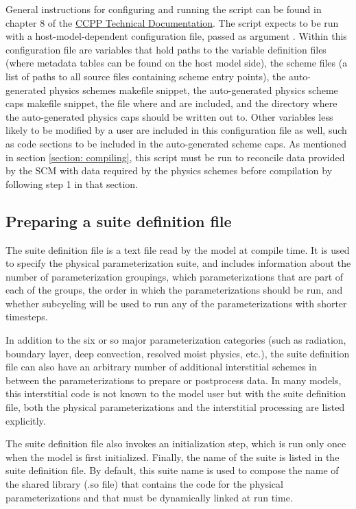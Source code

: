 General instructions for configuring and running the  script can be found in chapter 8 of the \href{https://ccpp-techdoc.readthedocs.io/en/v4.1.0/}{CCPP Technical Documentation}. The script expects to be run with a host-model-dependent configuration file, passed as argument . Within this configuration file are variables that hold paths to the variable definition files (where metadata tables can be found on the host model side), the scheme files (a list of paths to all source files containing scheme entry points), the auto-generated physics schemes makefile snippet, the auto-generated physics scheme caps makefile snippet, the file where  and  are included, and the directory where the auto-generated physics caps should be written out to. Other variables less likely to be modified by a user are included in this configuration file as well, such as code sections to be included in the auto-generated scheme caps. As mentioned in section \ref{section: compiling}, this script must be run to reconcile data provided by the SCM with data required by the physics schemes before compilation by following step 1 in that section.

\subsection{Preparing a suite definition file}
The suite definition file is a text file read by the model at compile time. It is used to specify the physical parameterization suite, and includes information about the number of parameterization groupings, which parameterizations that are part of each of the groups, the order in which the parameterizations should be run, and whether subcycling will be used to run any of the parameterizations with shorter timesteps.

In addition to the six or so major parameterization categories (such as radiation, boundary layer, deep convection, resolved moist physics, etc.), the suite definition file can also have an arbitrary number of additional interstitial schemes in between the parameterizations to prepare or postprocess data. In many models, this interstitial code is not known to the model user but with the suite definition file, both the physical parameterizations and the interstitial processing are listed explicitly.

The suite definition file also invokes an initialization step, which is run only once when the model is first initialized. Finally, the name of the suite is listed in the suite definition file. By default, this suite name is used to compose the name of the shared library (.so file) that contains the code for the physical parameterizations and that must be dynamically linked at run time.

